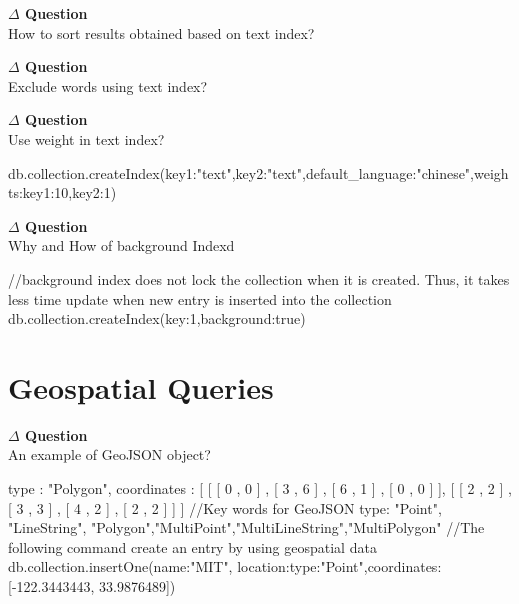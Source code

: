 \documentclass[12pt]{article}
\newenvironment{que}
    { \begin{mdframed}[backgroundcolor=green!20] \textbf{$\Delta$ Question} \\}
    {  \end{mdframed}}
\begin{document}
\begin{code}
\begin{code}
{//We can, of course, create combined text index
db.collection.createIndex({key1:"text",key2:"text"})
\end{code}
\begin{que}
How to sort results obtained based on text index?
\end{que}
\begin{que}
Exclude words using text index?
\end{que}
\begin{code}
//Exclude T-shirt in the string
db.collection.find({$text:{$search:"xxxx -t-shirt"})
\end{code}
\begin{que}
Use weight in text index?
\end{que}
\begin{code}
db.collection.createIndex({key1:"text",key2:"text"},{default_language:"chinese",weights:{key1:10,key2:1}})
\end{code}

\begin{que}
Why and How of background Indexd
\end{que}
\begin{code}
//background index does not lock the collection when it is created. Thus, it takes less time update when new entry is inserted into the collection
db.collection.createIndex({key:1},{background:true})
\end{code}

\newpage
\section{Geospatial Queries}
\begin{que}
An example of GeoJSON object?
\end{que}
\begin{code}
{
  type : "Polygon",
  coordinates : [
     [ [ 0 , 0 ] , [ 3 , 6 ] , [ 6 , 1 ] , [ 0 , 0 ] ],
     [ [ 2 , 2 ] , [ 3 , 3 ] , [ 4 , 2 ] , [ 2 , 2 ] ]
  ]
}
//Key words for GeoJSON type: "Point", "LineString", "Polygon","MultiPoint","MultiLineString","MultiPolygon"
//The following command create an entry by using geospatial data
db.collection.insertOne({name:"MIT", location:{type:"Point",coordinates:[-122.3443443, 33.9876489]}})
\end{code}


\end{code}
\end{document}
